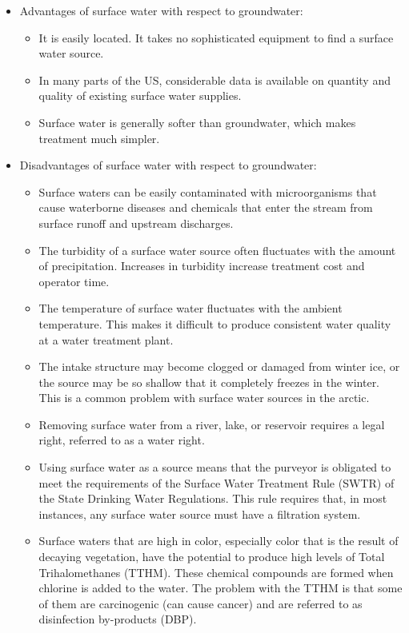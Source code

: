 \begin{itemize}
\item Advantages of surface water with respect to groundwater:
\begin{itemize}
\item It is easily located. It takes no sophisticated equipment to find a surface water source.
\item In many parts of the US, considerable data is available on quantity and quality of existing surface water supplies.
\item Surface water is generally softer than groundwater, which makes treatment much simpler.
\end{itemize}
\item Disadvantages of surface water with respect to groundwater:
\begin{itemize}
\item Surface waters can be easily contaminated with microorganisms that cause waterborne diseases and chemicals that enter the stream from surface runoff and upstream discharges.
\item The turbidity of a surface water source often fluctuates with the amount of precipitation. Increases in turbidity increase treatment cost and operator time.
\item The temperature of surface water fluctuates with the ambient temperature. This makes it difficult to produce consistent water quality at a water treatment plant.
\item The intake structure may become clogged or damaged from winter ice, or the source may be so shallow that it completely freezes in the winter. This is a common problem with surface water sources in the arctic.
\item Removing surface water from a river, lake, or reservoir requires a legal right, referred to as a water right. 
\item Using surface water as a source means that the purveyor is obligated to meet the requirements of the Surface Water Treatment Rule (SWTR) of the State Drinking Water Regulations. This rule requires that, in most instances, any surface water source must have a filtration system.
\item Surface waters that are high in color, especially color that is the result of decaying vegetation, have the potential to produce high levels of Total Trihalomethanes (TTHM). These chemical compounds are formed when chlorine is added to the water. The problem with the TTHM is that some of them are carcinogenic (can cause cancer) and are referred to as disinfection by-products (DBP).
\end{itemize}
\end{itemize}




